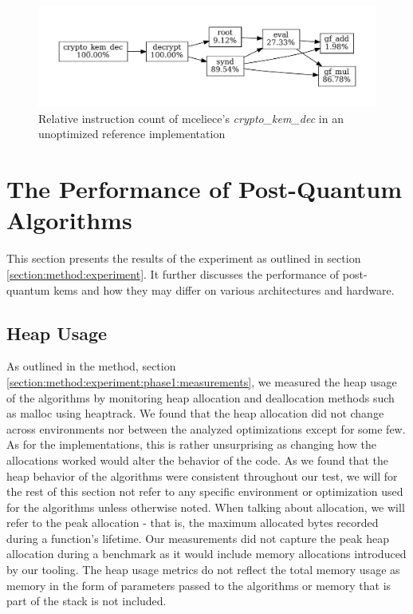 \begin{figure}[H]
    \centering
    \includegraphics[scale=0.5]{chapters/results/hot-paths/classic-mceliece/8192128/crypto_kem_dec.pdf}
    \caption{Relative instruction count of \gls{mceliece}'s \textit{crypto\_kem\_dec} in an unoptimized reference implementation}
    \label{figure:result:hot-paths:classic-mceliece:crypto_kem_dec}
\end{figure}

\section{The Performance of Post-Quantum Algorithms}

This section presents the results of the experiment as outlined in section \ref{section:method:experiment}. It further discusses the performance of \gls{post-quantum} \glspl{kem} and how they may differ on various architectures and hardware.

\subsection{Heap Usage}

As outlined in the method, section \ref{section:method:experiment:phase1:measurements}, we measured the heap usage of the algorithms by monitoring heap allocation and deallocation methods such as malloc using heaptrack. We found that the heap allocation did not change across environments nor between the analyzed optimizations except for some few. As for the implementations, this is rather unsurprising as changing how the allocations worked would alter the behavior of the code. As we found that the heap behavior of the algorithms were consistent throughout our test, we will for the rest of this section not refer to any specific environment or optimization used for the algorithms unless otherwise noted. When talking about allocation, we will refer to the peak allocation - that is, the maximum allocated bytes recorded during a function's lifetime. Our measurements did not capture the peak heap allocation during a benchmark as it would include memory allocations introduced by our tooling. The heap usage metrics do not reflect the total memory usage as memory in the form of parameters passed to the algorithms or memory that is part of the stack is not included.

